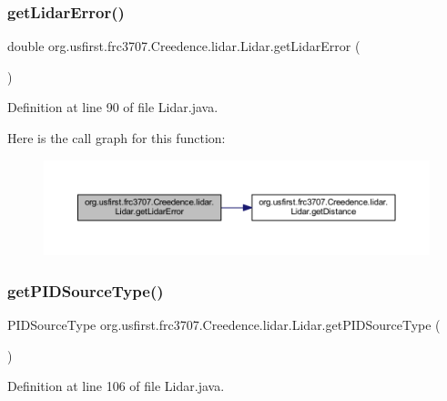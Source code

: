 \subsubsection{\texorpdfstring{getLidarError()}{getLidarError()}}
{\footnotesize\ttfamily double org.\+usfirst.\+frc3707.\+Creedence.\+lidar.\+Lidar.\+get\+Lidar\+Error (\begin{DoxyParamCaption}{ }\end{DoxyParamCaption})}



Definition at line 90 of file Lidar.\+java.

Here is the call graph for this function\+:
\nopagebreak
\begin{figure}[H]
\begin{center}
\leavevmode
\includegraphics[width=350pt]{classorg_1_1usfirst_1_1frc3707_1_1_creedence_1_1lidar_1_1_lidar_a4b43b720ccd9dc55a606ba0c91b3e894_cgraph}
\end{center}
\end{figure}
\mbox{\label{classorg_1_1usfirst_1_1frc3707_1_1_creedence_1_1lidar_1_1_lidar_a958a52e0a82063ef8daa2ea901659e9d}} 
\subsubsection{\texorpdfstring{getPIDSourceType()}{getPIDSourceType()}}
{\footnotesize\ttfamily P\+I\+D\+Source\+Type org.\+usfirst.\+frc3707.\+Creedence.\+lidar.\+Lidar.\+get\+P\+I\+D\+Source\+Type (\begin{DoxyParamCaption}{ }\end{DoxyParamCaption})}



Definition at line 106 of file Lidar.\+java.

\mbox{\label{classorg_1_1usfirst_1_1frc3707_1_1_creedence_1_1lidar_1_1_lidar_ab90708315a525426d46750ecb2f13e19}} 
